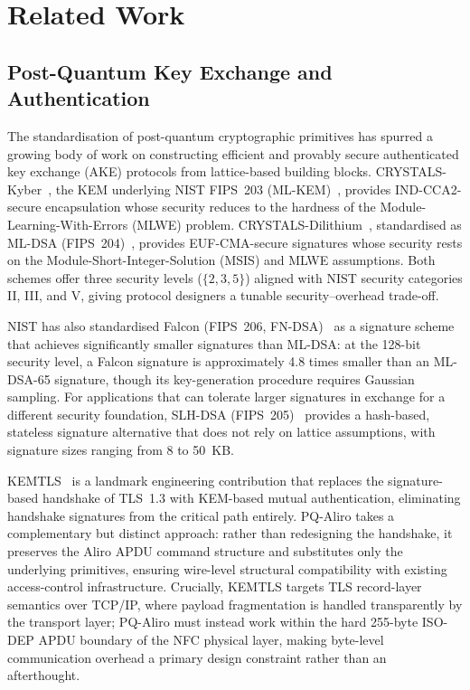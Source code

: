 \section{Related Work}
\label{sec:related}

\subsection{Post-Quantum Key Exchange and Authentication}
\label{sec:related:pqake}

The standardisation of post-quantum cryptographic primitives has spurred a
growing body of work on constructing efficient and provably secure authenticated
key exchange (AKE) protocols from lattice-based building blocks.
CRYSTALS-Kyber~\cite{EuroSP:BDKLLSSSS18}, the KEM underlying NIST FIPS~203
(ML-KEM)~\cite{NIST:FIPS203}, provides IND-CCA2-secure encapsulation whose
security reduces to the hardness of the Module-Learning-With-Errors (MLWE)
problem.
CRYSTALS-Dilithium~\cite{TCHES:DKLLSSS18}, standardised as ML-DSA (FIPS~204)~\cite{NIST:FIPS204},
provides EUF-CMA-secure signatures whose security rests on the Module-Short-Integer-Solution
(MSIS) and MLWE assumptions.
Both schemes offer three security levels ($\{2, 3, 5\}$) aligned with NIST
security categories II, III, and V, giving protocol designers a tunable
security--overhead trade-off.

NIST has also standardised Falcon (FIPS~206, FN-DSA)~\cite{NIST:FIPS206} as a
signature scheme that achieves significantly smaller signatures than ML-DSA: at
the 128-bit security level, a Falcon signature is approximately 4.8 times
smaller than an ML-DSA-65 signature, though its key-generation procedure
requires Gaussian sampling.
For applications that can tolerate larger signatures in exchange for a
different security foundation, SLH-DSA (FIPS~205)~\cite{NIST:FIPS205} provides
a hash-based, stateless signature alternative that does not rely on lattice
assumptions, with signature sizes ranging from 8 to 50~KB.

KEMTLS~\cite{CCS:SchSteWig20} is a landmark engineering contribution that
replaces the signature-based handshake of TLS~1.3 with KEM-based mutual
authentication, eliminating handshake signatures from the critical path entirely.
PQ-Aliro takes a complementary but distinct approach: rather than redesigning
the handshake, it preserves the Aliro APDU command structure and substitutes
only the underlying primitives, ensuring wire-level structural compatibility
with existing access-control infrastructure.
Crucially, KEMTLS targets TLS record-layer semantics over TCP/IP, where
payload fragmentation is handled transparently by the transport layer; PQ-Aliro
must instead work within the hard 255-byte ISO-DEP APDU boundary of the NFC
physical layer, making byte-level communication overhead a primary design
constraint rather than an afterthought.

